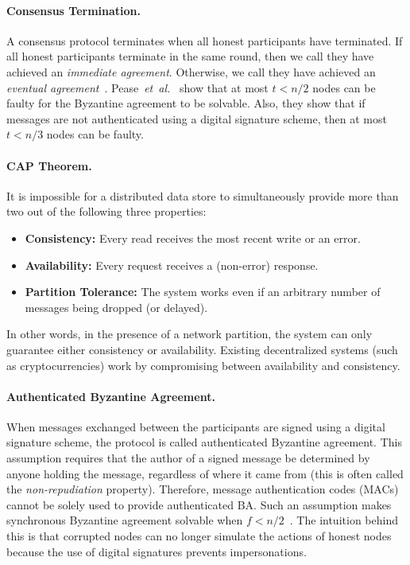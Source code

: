 \documentclass[11pt]{article}
\newcommand{\etal}{\textit{et~al.}}
\theoremstyle{mytheoremstyle}
\begin{document}
\paragraph{Consensus Termination.} A consensus protocol terminates when all honest participants have terminated. If all honest participants terminate in the same round, then we call they have achieved an \emph{immediate agreement}. Otherwise, we call they have achieved an \emph{eventual agreement}~\cite{fischer}.
Pease~\etal~\cite{pease80reaching} show that at most ${t<n/2}$ nodes can be faulty for the Byzantine agreement to be solvable. Also, they show that if messages are not authenticated using a digital signature scheme, then at most ${t<n/3}$ nodes can be faulty.

\paragraph{CAP Theorem.} It is impossible for a distributed data store to simultaneously provide more than two out of the following three properties: 
\begin{itemize}
	\item \textbf{Consistency:} Every read receives the most recent write or an error.
	\item \textbf{Availability:} Every request receives a (non-error) response.
	\item \textbf{Partition Tolerance:} The system works even if an arbitrary number of messages being dropped (or delayed).
\end{itemize}
In other words, in the presence of a network partition, the system can only guarantee either consistency or availability. Existing decentralized systems (such as cryptocurrencies) work by compromising between availability and consistency.

\paragraph{Authenticated Byzantine Agreement.}
When messages exchanged between the participants are signed using a digital signature scheme, the protocol is called authenticated Byzantine agreement. This assumption requires that the author of a signed message be determined by anyone holding the message, regardless of where it came from (this is often called the \emph{non-repudiation} property). Therefore, message authentication codes (MACs) cannot be solely used to provide authenticated BA. Such an assumption makes synchronous Byzantine agreement solvable when $f<n/2$~\cite{srini2017}. The intuition behind this is that corrupted nodes can no longer simulate the actions of honest nodes because the use of digital signatures prevents impersonations.
\end{document}

